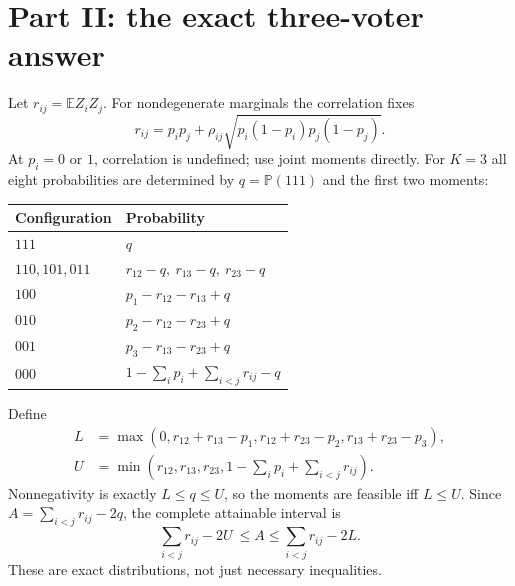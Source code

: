 \documentclass{article}
\newcommand{\Prb}{\mathbb P}
\newcommand{\Ex}{\mathbb E}
\begin{document}
\section{Part II: the exact three-voter answer}
Let $r_{ij}=\Ex Z_iZ_j$. For nondegenerate marginals the correlation fixes
\begin{equation}
 r_{ij}=p_ip_j+\rho_{ij}\sqrt{p_i(1-p_i)p_j(1-p_j)}.
\end{equation}
At $p_i=0$ or $1$, correlation is undefined; use joint moments directly. For $K=3$ all eight probabilities are determined by $q=\Prb(111)$ and the first two moments:
\begin{center}
\begin{tabular}{@{}ll@{}}
\toprule
Configuration & Probability\\\midrule
$111$ & $q$\\
$110,101,011$ & $r_{12}-q,\ r_{13}-q,\ r_{23}-q$\\
$100$ & $p_1-r_{12}-r_{13}+q$\\
$010$ & $p_2-r_{12}-r_{23}+q$\\
$001$ & $p_3-r_{13}-r_{23}+q$\\
$000$ & $1-\sum_i p_i+\sum_{i<j}r_{ij}-q$\\\bottomrule
\end{tabular}
\end{center}
Define
\begin{align}
 L&=\max(0,r_{12}+r_{13}-p_1,r_{12}+r_{23}-p_2,r_{13}+r_{23}-p_3),\\
 U&=\min(r_{12},r_{13},r_{23},1-\textstyle\sum_i p_i+\sum_{i<j}r_{ij}).
\end{align}
Nonnegativity is exactly $L\le q\le U$, so the moments are feasible iff $L\le U$. Since $A=\sum_{i<j}r_{ij}-2q$, the complete attainable interval is
\begin{equation}\label{eq:threeinterval}
 \boxed{\ \sum_{i<j}r_{ij}-2U\ \le A\le\sum_{i<j}r_{ij}-2L.\ }
\end{equation}
These are exact distributions, not just necessary inequalities.
\end{document}
